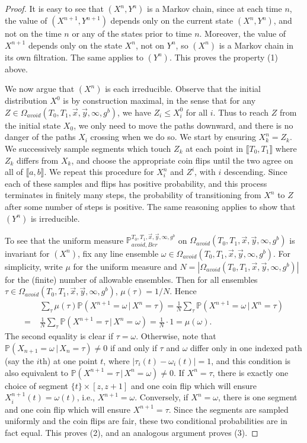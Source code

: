 \begin{proof}
	It is easy to see that $(X^n,Y^n)$ is a Markov chain, since at each time $n$, the value of $(X^{n+1},Y^{n+1})$ depends only on the current state $(X^n,Y^n)$, and not on the time $n$ or any of the states prior to time $n$. Moreover, the value of $X^{n+1}$ depends only on the state $X^n$, not on $Y^n$, so $(X^n)$ is a Markov chain in its own filtration. The same applies to $(Y^n)$. This proves the property (1) above.
	
	We now argue that $(X^n)$ is each irreducible. Observe that the initial distribution $X^0$ is by construction maximal, in the sense that for any $Z\in \Omega_{avoid}(T_0,T_1,\vec{x},\vec{y},\infty,g^b)$, we have $Z_i \leq X^0_i$ for all $i$. Thus to reach $Z$ from the initial state $X_0$, we only need to move the paths downward, and there is no danger of the paths $X_i$ crossing when we do so. We start by ensuring $X^n_k = Z_k$. We successively sample segments which touch $Z_k$ at each point in $\llbracket T_0,T_1\rrbracket$ where $Z_k$ differs from $X_k$, and choose the appropriate coin flips until the two agree on all of $\llbracket a,b\rrbracket$. We repeat this procedure for $X^n_i$ and $Z^i$, with $i$ descending. Since each of these samples and flips has positive probability, and this process terminates in finitely many steps, the probability of transitioning from $X^n$ to $Z$ after some number of steps is positive. The same reasoning applies to show that $(Y^n)$ is irreducible.
	
	To see that the uniform measure $\mathbb{P}_{avoid,Ber}^{T_0,T_1,\vec{x},\vec{y},\infty,g^b}$ on $\Omega_{avoid}(T_0,T_1,\vec{x},\vec{y},\infty,g^b)$ is invariant for $(X^n)$, fix any line ensemble $\omega\in\Omega_{avoid}(T_0,T_1,\vec{x},\vec{y},\infty,g^b)$. For simplicity, write $\mu$ for the uniform measure and $N=|\Omega_{avoid}(T_0,T_1,\vec{x},\vec{y},\infty,g^b)|$ for the (finite) number of allowable ensembles. Then for all ensembles $\tau\in\Omega_{avoid}(T_0,T_1,\vec{x},\vec{y},\infty,g^b)$, $\mu(\tau) = 1/N$. Hence
	\begin{align*}
	& \sum_\tau \mu(\tau)\mathbb{P}(X^{n+1} = \omega\,|\,X^n = \tau) = \frac{1}{N}\sum_\tau \mathbb{P}(X^{n+1} = \omega\,|\,X^n = \tau)\\
	= \; & \frac{1}{N}\sum_\tau \mathbb{P}(X^{n+1} = \tau\,|\,X^n = \omega) = \frac{1}{N}\cdot 1 = \mu(\omega).
	\end{align*}
	The second equality is clear if $\tau=\omega$. Otherwise, note that $\mathbb{P}(X_{n+1} = \omega\,|\,X_n = \tau) \neq 0$ if and only if $\tau$ and $\omega$ differ only in one indexed path (say the $i$th) at one point $t$, where $|\tau_i(t)-\omega_i(t)|=1$, and this condition is also equivalent to $\mathbb{P}(X^{n+1} = \tau\,|\,X^n = \omega) \neq 0$. If $X^n=\tau$, there is exactly one choice of segment $\{t\}\times[z,z+1]$ and one coin flip which will ensure $X^{n+1}_i(t)=\omega(t)$, i.e., $X^{n+1}=\omega$. Conversely, if $X^n=\omega$, there is one segment and one coin flip which will ensure $X^{n+1}=\tau$. Since the segments are sampled uniformly and the coin flips are fair, these two conditional probabilities are in fact equal. This proves (2), and an analogous argument proves (3).
	

\end{proof}
